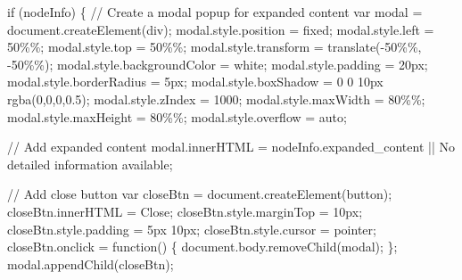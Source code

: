 \documentclass[
  11pt,
  letterpaper,
]{book}
\newenvironment{Shaded}{\begin{snugshade}}{\end{snugshade}}
\newcommand{\SpecialCharTok}[1]{\textcolor[rgb]{0.37,0.37,0.37}{#1}}
\newcommand{\StringTok}[1]{\textcolor[rgb]{0.13,0.47,0.30}{#1}}
\begin{document}
\begin{Shaded}
\begin{Highlighting}[]
\StringTok{            if (nodeInfo) \{}
\StringTok{                // Create a modal popup for expanded content}
\StringTok{                var modal = document.createElement(\textquotesingle{}div\textquotesingle{});}
\StringTok{                modal.style.position = \textquotesingle{}fixed\textquotesingle{};}
\StringTok{                modal.style.left = \textquotesingle{}50}\SpecialCharTok{\%\%}\StringTok{\textquotesingle{};}
\StringTok{                modal.style.top = \textquotesingle{}50}\SpecialCharTok{\%\%}\StringTok{\textquotesingle{};}
\StringTok{                modal.style.transform = \textquotesingle{}translate({-}50}\SpecialCharTok{\%\%}\StringTok{, {-}50}\SpecialCharTok{\%\%}\StringTok{)\textquotesingle{};}
\StringTok{                modal.style.backgroundColor = \textquotesingle{}white\textquotesingle{};}
\StringTok{                modal.style.padding = \textquotesingle{}20px\textquotesingle{};}
\StringTok{                modal.style.borderRadius = \textquotesingle{}5px\textquotesingle{};}
\StringTok{                modal.style.boxShadow = \textquotesingle{}0 0 10px rgba(0,0,0,0.5)\textquotesingle{};}
\StringTok{                modal.style.zIndex = \textquotesingle{}1000\textquotesingle{};}
\StringTok{                modal.style.maxWidth = \textquotesingle{}80}\SpecialCharTok{\%\%}\StringTok{\textquotesingle{};}
\StringTok{                modal.style.maxHeight = \textquotesingle{}80}\SpecialCharTok{\%\%}\StringTok{\textquotesingle{};}
\StringTok{                modal.style.overflow = \textquotesingle{}auto\textquotesingle{};}

\StringTok{                // Add expanded content}
\StringTok{                modal.innerHTML = nodeInfo.expanded\_content || \textquotesingle{}No detailed information available\textquotesingle{};}

\StringTok{                // Add close button}
\StringTok{                var closeBtn = document.createElement(\textquotesingle{}button\textquotesingle{});}
\StringTok{                closeBtn.innerHTML = \textquotesingle{}Close\textquotesingle{};}
\StringTok{                closeBtn.style.marginTop = \textquotesingle{}10px\textquotesingle{};}
\StringTok{                closeBtn.style.padding = \textquotesingle{}5px 10px\textquotesingle{};}
\StringTok{                closeBtn.style.cursor = \textquotesingle{}pointer\textquotesingle{};}
\StringTok{                closeBtn.onclick = function() \{}
\StringTok{                    document.body.removeChild(modal);}
\StringTok{                \};}
\StringTok{                modal.appendChild(closeBtn);}


\end{Highlighting}
\end{Shaded}
\end{document}
